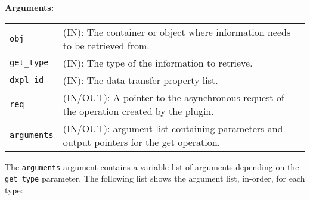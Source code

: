 \textbf{Arguments:}\\
\begin{tabular}{l p{10cm}}
  {\tt obj} & (IN): The container or object where information needs to be
  retrieved from.\\
  {\tt get\_type} & (IN): The type of the information to retrieve.\\
  {\tt dxpl\_id} & (IN): The data transfer property list.\\
  {\tt req} & (IN/OUT): A pointer to the asynchronous request of the
  operation created by the plugin.\\
  {\tt arguments} & (IN/OUT): argument list containing parameters and
  output pointers for the get operation. \\
\end{tabular}

The {\tt arguments} argument contains a variable list of arguments
depending on the {\tt get\_type} parameter. The following list shows
the argument list, in-order, for each type:

